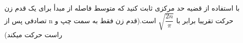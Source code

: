 \problem{}
با استفاده از قضیه حد مرکزی ثابت کنید که متوسط فاصله از مبدأ برای یک قدم زن تصادفی
پس از n حرکت تقریبا برابر با $\sqrt{\dfrac{2n}{\pi}}$ است.(قدم زن فقط به سمت چپ و راست حرکت میکند)